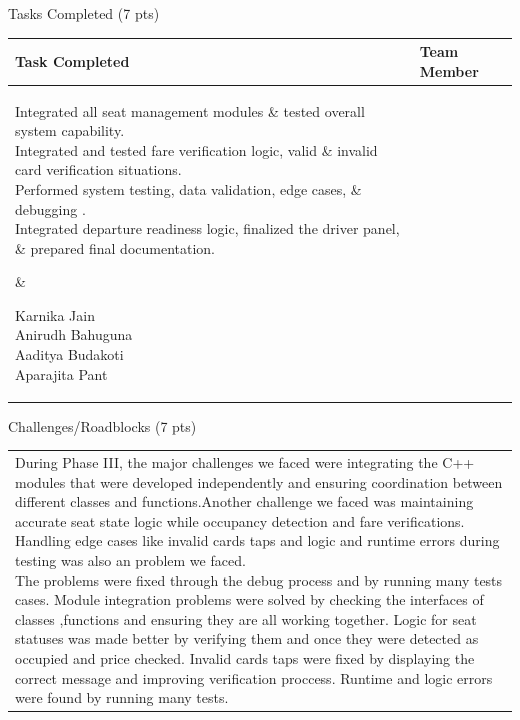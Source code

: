 \documentclass[12pt,a4paper]{article}
\newcommand{\sectiontitle}[1]{%
    {\color{GEUBlue}
    \fontsize{18}{22}\selectfont #1}
}
\newcommand{\answerbox}[2]{%
    \begin{tabularx}{\textwidth}{
        |>{\raggedright\arraybackslash}X|}
        \hline
        \parbox[t][#1][t]{\dimexpr\linewidth-12pt\relax}{
            \vspace{5pt}
            \fontsize{11}{13}\selectfont #2
        }\\
        \hline
    \end{tabularx}
}
\begin{document}
\newpage


\vspace*{0.20cm}

\sectiontitle{Tasks Completed (7 pts)}

\vspace{0.05cm}


\vspace{0.20cm}

\begin{tabularx}{\textwidth}{
|>{\raggedright\arraybackslash}X
|>{\raggedright\arraybackslash}X|
}
\hline

\textbf{Task Completed} &
\textbf{Team Member}
\\[0.3cm]
\hline

\parbox[t][4.5cm][t]{\linewidth}{Integrated all seat management modules \& tested overall system capability.\\[0.1cm]
Integrated and tested fare verification logic, valid \& invalid card verification situations.\\[0.1cm]
Performed system testing, data validation, edge cases, \& debugging .\\[0.1cm]
Integrated departure readiness logic, finalized the driver panel, \& prepared final documentation.}
&
\parbox[t][4.5cm][t]{\linewidth}{Karnika Jain\\[0.7cm]
Anirudh Bahuguna\\[0.7cm]
Aaditya Budakoti\\[0.7cm]
Aparajita Pant}
\\
\hline

\end{tabularx}

\vspace{0.65cm}

\sectiontitle{Challenges/Roadblocks (7 pts)}

\vspace{0.05cm}


\vspace{0.18cm}

\answerbox{5.05cm}{During Phase III, the major challenges we faced were integrating the C++ modules that were developed independently and ensuring coordination between different classes and functions.Another challenge we faced  was maintaining accurate seat state logic while occupancy detection and fare verifications. Handling  edge cases like invalid cards taps and logic and runtime errors during testing was also an problem we faced. \\[0.2cm] The problems were  fixed through the debug process and by running many tests cases. Module integration problems were solved by checking the interfaces of classes ,functions and ensuring they are all working together. Logic for seat statuses was made better by verifying them and once they were detected as occupied and price checked. Invalid cards taps were fixed by displaying the correct message and improving verification proccess. Runtime and logic errors were found by running many tests. }
\end{document}
